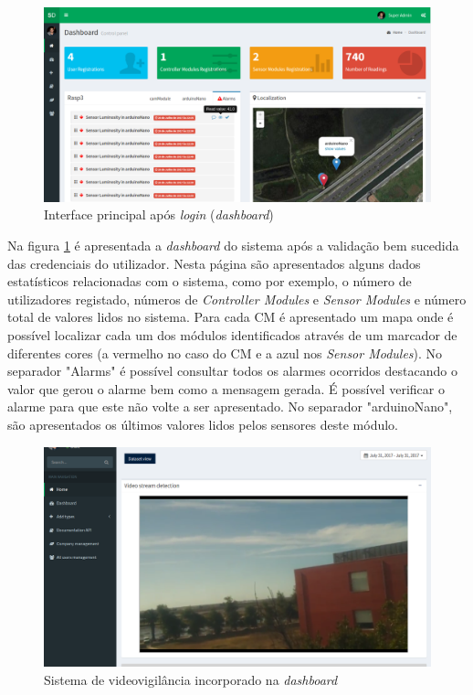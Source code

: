 \begin{figure}[h]
	\centering
	\includegraphics[width=0.9\linewidth]{prints-web/dashboard1.png}
	\caption{Interface principal após \textit{login} (\textit{dashboard})}
	\label{ddashboard}
\end{figure}



Na figura \ref{ddashboard} é apresentada a \textit{dashboard} do sistema após a validação bem sucedida das credenciais do utilizador. Nesta página são apresentados alguns dados estatísticos relacionadas com o sistema, como por exemplo, o número de utilizadores registado, números de \textit{Controller Modules} e \textit{Sensor Modules} e número total de valores lidos no sistema. Para cada \acl{CM} é apresentado um mapa onde é possível localizar cada um dos módulos identificados através de um marcador de diferentes cores (a vermelho no caso do \acl{CM} e a azul nos \textit{Sensor Modules}). No separador "Alarms" é possível consultar todos os alarmes ocorridos destacando o valor que gerou o alarme bem como a mensagem gerada. É possível verificar o alarme para que este não volte a ser apresentado. No separador "arduinoNano", são apresentados os últimos valores lidos pelos sensores deste módulo. 


\begin{figure}[h]
	\centering
	\includegraphics[width=0.7\linewidth]{prints-web/stream.png}
	\caption{Sistema de videovigilância incorporado na \textit{dashboard}}
	\label{vigilancia}
\end{figure}







